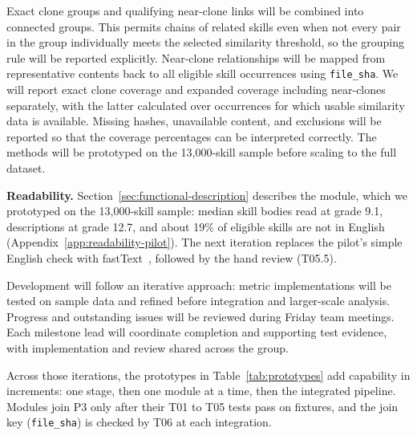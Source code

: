 Exact clone groups and qualifying near-clone links will be combined into connected groups. This permits chains of related skills even when not every pair in the group individually meets the selected similarity threshold, so the grouping rule will be reported explicitly. Near-clone relationships will be mapped from representative contents back to all eligible skill occurrences using \texttt{file\_sha}. We will report exact clone coverage and expanded coverage including near-clones separately, with the latter calculated over occurrences for which usable similarity data is available. Missing hashes, unavailable content, and exclusions will be reported so that the coverage percentages can be interpreted correctly. The methods will be prototyped on the 13,000-skill sample before scaling to the full dataset.\par


\noindent\textbf{Readability.}
Section~\ref{sec:functional-description} describes the module, which we prototyped on the 13,000-skill sample: median skill bodies read at grade 9.1, descriptions at grade 12.7, and about 19\% of eligible skills are not in English (Appendix~\ref{app:readability-pilot}). The next iteration replaces the pilot's simple English check with fastText~\cite{joulin2017bag}, followed by the hand review (T05.5).\par


Development will follow an iterative approach: metric implementations will be tested on sample data and refined before integration and larger-scale analysis. Progress and outstanding issues will be reviewed during Friday team meetings. Each milestone lead will coordinate completion and supporting test evidence, with implementation and review shared across the group.

Across those iterations, the prototypes in Table~\ref{tab:prototypes} add capability in increments: one stage, then one module at a time, then the integrated pipeline. Modules join P3 only after their T01 to T05 tests pass on fixtures, and the join key (\texttt{file\_sha}) is checked by T06 at each integration.

